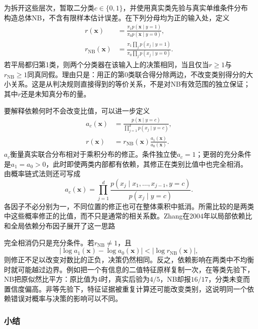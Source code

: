 为拆开这些层次，暂取二分类$c\in\{0,1\}$，并使用真实类先验与真实单维条件分布构造总体NB，不含有限样本估计误差。在下列分母均为正的输入处，定义
\begin{equation}
  \label{eq:classification-naive-bayes-ratios}
  \begin{aligned}
    r(\bm{x})
      &=\frac{\pi_1p(\bm{x}\mid y=1)}
              {\pi_0p(\bm{x}\mid y=0)},\\
    r_{\mathrm{NB}}(\bm{x})
      &=\frac{\pi_1\prod_jp(x_j\mid y=1)}
              {\pi_0\prod_jp(x_j\mid y=0)}.
  \end{aligned}
\end{equation}
若平局都归第1类，则两个分类器在该输入上的决策相同，当且仅当$r\geq1$与$r_{\mathrm{NB}}\geq1$同真同假。理由只是：用正的第0类联合得分除两边，不改变类别得分的大小关系。这是从判决规则直接得到的等价关系，不是对NB有效范围的独立保证；其中$r$还是未知真分布的量。

要解释依赖何时不会改变比值，可以进一步定义
\begin{equation}
  \label{eq:classification-naive-bayes-dependence}
  \begin{aligned}
    a_c(\bm{x})
      &=\frac{p(\bm{x}\mid y=c)}
              {\prod_{j=1}^{d}p(x_j\mid y=c)},\\
    r(\bm{x})
      &=r_{\mathrm{NB}}(\bm{x})
        \frac{a_1(\bm{x})}{a_0(\bm{x})}.
  \end{aligned}
\end{equation}
$a_c$衡量真实联合分布相对于乘积分布的修正。条件独立使$a_c=1$；更弱的充分条件是$a_1=a_0>0$，此时即使两类内部都有依赖，其修正在类别比值中也完全相消。由概率链式法则还可写成
\[
  a_c(\bm{x})
  =\prod_{j=1}^{d}
    \frac{p(x_j\mid x_1,\ldots,x_{j-1},y=c)}
         {p(x_j\mid y=c)}.
\]
各因子不必分别为一，不同位置的修正也可在整体乘积中抵消。所需比较的是两类中这些概率修正的比值，而不只是通常的相关系数。Zhang在2004年以局部依赖比和全局依赖分布因子展开了这一思路

完全相消仍只是充分条件。若$r_{\mathrm{NB}}\neq1$，且
\[
  \left|\log a_1(\bm{x})-\log a_0(\bm{x})\right|
  <\left|\log r_{\mathrm{NB}}(\bm{x})\right|,
\]
则修正不足以改变对数比的正负，决策仍然相同。反之，依赖影响在两类中不均衡时就可能越过边界。例如把一个有信息的二值特征原样复制一次，在等类先验下，NB把原似然比平方：原比值为4时，真实后验为$4/5$，NB却报$16/17$，分类未变而置信度偏高。非等先验下，特征证据被重复计算还可能改变类别，这说明同一个依赖错误对概率与决策的影响可以不同。

\subsubsection{小结}
\label{sec:classification-naive-bayes-summary}

